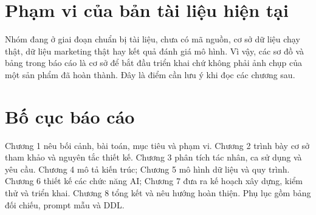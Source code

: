 \section*{Phạm vi của bản tài liệu hiện tại}

Nhóm đang ở giai đoạn chuẩn bị tài liệu, chưa có mã nguồn, cơ sở dữ liệu chạy thật, dữ liệu marketing thật hay kết quả đánh giá mô hình. Vì vậy, các sơ đồ và bảng trong báo cáo là cơ sở để bắt đầu triển khai chứ không phải ảnh chụp của một sản phẩm đã hoàn thành. Đây là điểm cần lưu ý khi đọc các chương sau.

\section*{Bố cục báo cáo}

Chương 1 nêu bối cảnh, bài toán, mục tiêu và phạm vi. Chương 2 trình bày cơ sở tham khảo và nguyên tắc thiết kế. Chương 3 phân tích tác nhân, ca sử dụng và yêu cầu. Chương 4 mô tả kiến trúc; Chương 5 mô hình dữ liệu và quy trình. Chương 6 thiết kế các chức năng AI; Chương 7 đưa ra kế hoạch xây dựng, kiểm thử và triển khai. Chương 8 tổng kết và nêu hướng hoàn thiện. Phụ lục gồm bảng đối chiếu, prompt mẫu và DDL.
